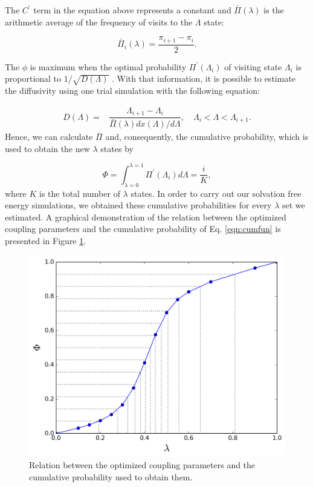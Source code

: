 \documentclass[
	12pt,				%
	openany,			%
	oneside,			%
	a4paper,			%
	english,			%
	brazil				%
	]{abntex2}
\providecommand{\DIFaddbeginFL}{}
\providecommand{\DIFaddendFL}{}
\providecommand{\DIFdelbeginFL}{}
\providecommand{\DIFdelendFL}{}
\providecommand{\DIFaddbeginFL}{} %
\providecommand{\DIFaddendFL}{} %
\providecommand{\DIFdelbeginFL}{} %
\providecommand{\DIFdelendFL}{} %
\begin{document}
The $C^{'} $ term in the equation above represents a constant and $\bar{\Pi} (\lambda)$ is the arithmetic average of the frequency of visits to the $\Lambda$ state:

\begin{equation}
\bar{\Pi}_{i} (\lambda) = \dfrac{\pi_{i+1} - \pi_{i}}{2}.
\label{eqn:barplambda}
\end{equation}

The $\phi$ is maximum when the optimal probability $\Pi^{'}(\Lambda_{i})$ of visiting state $\Lambda_{i}$ is proportional to $1/\sqrt{D(\Lambda)}$ \cite{trebst2004}. With that information, it is possible to estimate the diffusivity using one trial simulation with the following equation:

\begin{equation}
\begin{aligned}
D(\Lambda) {}=& \dfrac{\Lambda_{i+1} - \Lambda_{i}}{\bar{\Pi} (\lambda) {dx(\Lambda)}/{d \Lambda}}, \quad \Lambda_{i} < \Lambda < \Lambda_{i+1}.
\end{aligned}
\label{eqn:diff}
\end{equation}    
Hence, we can calculate $\bar{\Pi} $ and, consequently, the cumulative probability, which is used to obtain the new $\lambda$ states by

\begin{equation}
\Phi = \int_{\lambda =0}^{\lambda =1} \Pi^{'}(\Lambda_{i}) d \Lambda = \dfrac{i}{K},
\label{eqn:cumfun}
\end{equation}
where $K$ is the total number of $\lambda$ states. In order to carry out our solvation free energy simulations, we obtained these cumulative probabilities for every $\lambda$ set we estimated. A graphical demonstration of the relation between the optimized coupling parameters and the cumulative probability of Eq. \ref{eqn:cumfun} is presented in Figure \ref{fig:optimized_cdfexeample}.

\begin{figure}[h]
	\centering
	\DIFdelbeginFL %
\DIFdelendFL \DIFaddbeginFL \includegraphics[width=0.75\linewidth]{Figures/optimized_cdfexeample}
	\DIFaddendFL \caption{Relation between the optimized coupling parameters and the cumulative probability used to obtain them.}
	\label{fig:optimized_cdfexeample}
\end{figure}
\FloatBarrier
\end{document}
